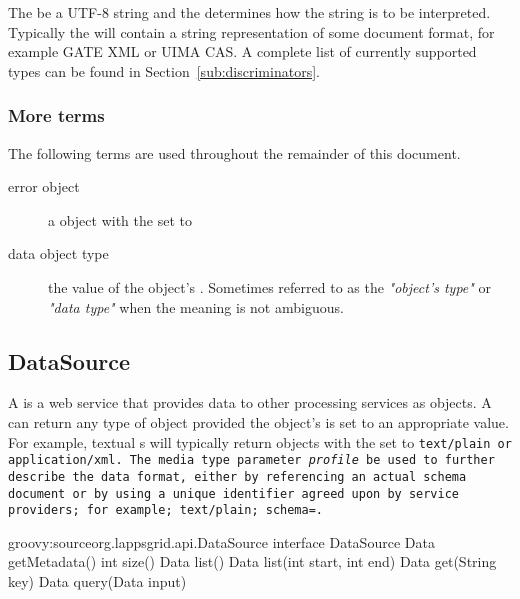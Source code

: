 The \payload \should be a UTF-8 string and the \discriminator determines how the string is to be interpreted.  Typically the \payload will contain a string representation of some document format, for example GATE XML or UIMA CAS.  A complete list of currently supported \discriminator types can be found in Section~\ref{sub:discriminators}. 

\subsubsection{More terms}
The following terms are used throughout the remainder of this document.

\begin{description}
\item[error object] a \data object with the \discriminator set to 
\item[data object type] the value of the \data object's \discriminator. Sometimes referred to as the \emph{"object's type"} or \emph{"data type"} when the meaning is not ambiguous.
\end{description}


\subsection{DataSource}


A \source is a web service that provides data to other processing services as \data objects. A \source can return any type of \data object provided the \data object's \discriminator is set to an appropriate value.  For example, textual \source{}s will typically return \data objects with the \discriminator set to \tt{text/plain} or \tt{application/xml}. The media type parameter \emph{profile}  \may be used to further describe the data format, either by referencing an actual schema document or by using a unique identifier agreed upon by service providers; for example; \tt{text/plain; schema=}.

\begin{groovy}{groovy:source}{org.lappsgrid.api.DataSource}
	interface DataSource {
		Data getMetadata()
		int size()
		Data list()
		Data list(int start, int end)
		Data get(String key)
		Data query(Data input)
	}
\end{groovy}

